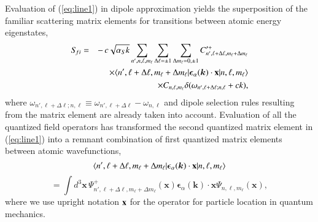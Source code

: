 \documentclass[final,3p,times,twocolumn]{elsarticle3}
\begin{document}
Evaluation of (\ref{eq:line1}) in dipole approximation yields the superposition 
of the familiar scattering matrix elements for transitions between atomic 
energy eigenstates,
\begin{eqnarray}\nonumber
S_{\!fi}&=&-\,c\sqrt{\alpha_S k}
\sum_{n',n,\ell,m_\ell}\sum_{\Delta\ell=\pm 1}\sum_{\Delta m_\ell=0,\pm 1}
C'^+_{n',\ell+\Delta\ell,m_\ell+\Delta m_\ell}
\\ \nonumber
&&\times
\langle n',\ell+\Delta\ell,m_\ell+\Delta m_\ell|
\bm{\epsilon}_\alpha(\bm{k})\cdot\mathrm{\bf x}|n,\ell,m_\ell\rangle
\\ \label{eq:line2}
&&\times
C_{n,\ell,m_\ell}\delta(\omega_{n',\ell+\Delta\ell;n,\ell}+ck),
\end{eqnarray}
where $\omega_{n',\ell+\Delta\ell;n,\ell}\equiv\omega_{n',\ell+\Delta\ell}-\omega_{n,\ell}$
and dipole selection rules resulting from the matrix element are 
already taken into account. Evaluation of all the quantized field operators
has transformed the second quantized matrix element in (\ref{eq:line1}) 
into a remnant combination of first quantized matrix elements between 
atomic wavefunctions,
\[
\langle n',\ell+\Delta\ell,m_\ell+\Delta m_\ell|
\bm{\epsilon}_\alpha(\bm{k})\cdot\mathrm{\bf x}|n,\ell,m_\ell\rangle
\]
\[
=\int\!d^3\bm{x}\,\Psi^+_{n',\ell+\Delta\ell,m_\ell+\Delta m_\ell}(\bm{x})
\bm{\epsilon}_\alpha(\bm{k})\cdot\bm{x}\Psi_{n,\ell,m_\ell}(\bm{x}),
\]
where we use upright notation $\mathrm{\bf x}$ for the
operator for particle location in quantum mechanics.
\end{document}
